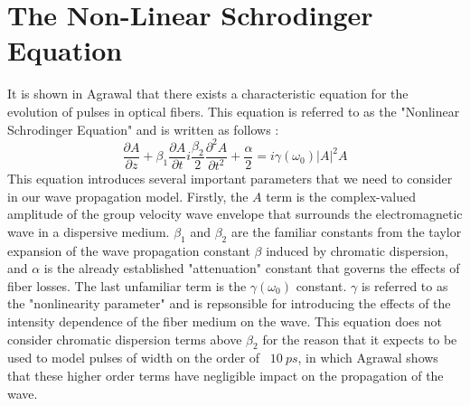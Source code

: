 \documentclass[10pt, a4paper, twocolumn]{article} %
\begin{document}


\section{The Non-Linear Schrodinger Equation}
It is shown in Agrawal that there exists a characteristic equation for the evolution of pulses in optical fibers. This equation is referred to as the "Nonlinear Schrodinger Equation" and is written as follows \cite{AgrawalChap2}:
$$\frac{\partial A}{\partial z} + \beta_1 \frac{\partial A}{\partial t} i\frac{\beta_2}{2}\frac{\partial^2 A}{\partial t^2} + \frac{\alpha}{2} = i \gamma(\omega_0)|A|^2A$$
This equation introduces several important parameters that we need to consider in our wave propagation model. Firstly, the $A$ term is the complex-valued amplitude of the group velocity wave envelope that surrounds the electromagnetic wave in a dispersive medium. $\beta_1$ and $\beta_2$ are the familiar constants from the taylor expansion of the wave propagation constant $\beta$ induced by chromatic dispersion, and $\alpha$ is the already established "attenuation" constant that governs the effects of fiber losses. The last unfamiliar term is the $\gamma(\omega_0)$ constant. $\gamma$ is referred to as the "nonlinearity parameter" and is repsonsible for introducing the effects of the intensity dependence of the fiber medium on the wave. This equation does not consider chromatic dispersion terms above $\beta_2$ for the reason that it expects to be used to model pulses of width on the order of ~$10\ ps$, in which Agrawal shows that these higher order terms have negligible impact on the propagation of the wave.
\end{document}

